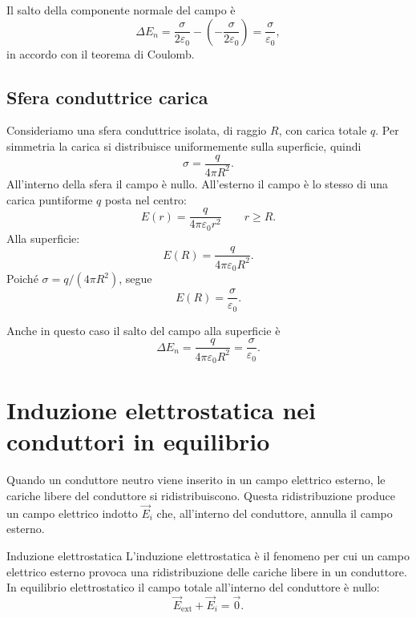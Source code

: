 \documentclass[a4paper]{article}
\begin{document}
Il salto della componente normale del campo è
\[
    \Delta E_n=\frac{\sigma}{2\varepsilon_0}-\left(-\frac{\sigma}{2\varepsilon_0}\right)=\frac{\sigma}{\varepsilon_0},
\]
in accordo con il teorema di Coulomb.

\subsection{Sfera conduttrice carica}

Consideriamo una sfera conduttrice isolata, di raggio \(R\), con carica totale \(q\). Per simmetria la carica si distribuisce uniformemente sulla superficie, quindi
\[
    \sigma=\frac{q}{4\pi R^2}.
\]
All'interno della sfera il campo è nullo. All'esterno il campo è lo stesso di una carica puntiforme \(q\) posta nel centro:
\[
    E(r)=\frac{q}{4\pi\varepsilon_0r^2}\qquad r\geq R.
\]
Alla superficie:
\[
    E(R)=\frac{q}{4\pi\varepsilon_0R^2}.
\]
Poiché \(\sigma=q/(4\pi R^2)\), segue
\[
    E(R)=\frac{\sigma}{\varepsilon_0}.
\]

\begin{center}
\end{center}

Anche in questo caso il salto del campo alla superficie è
\[
    \Delta E_n=\frac{q}{4\pi\varepsilon_0R^2}=\frac{\sigma}{\varepsilon_0}.
\]

\section{Induzione elettrostatica nei conduttori in equilibrio}

Quando un conduttore neutro viene inserito in un campo elettrico esterno, le cariche libere del conduttore si ridistribuiscono. Questa ridistribuzione produce un campo elettrico indotto \(\vec{E}_i\) che, all'interno del conduttore, annulla il campo esterno.

\begin{snippetdefinition}{Induzione elettrostatica}
    L'induzione elettrostatica è il fenomeno per cui un campo elettrico esterno provoca una ridistribuzione delle cariche libere in un conduttore. In equilibrio elettrostatico il campo totale all'interno del conduttore è nullo:
    \[
        \vec{E}_{\mathrm{ext}}+\vec{E}_i=\vec{0}.
    \]
\end{snippetdefinition}
\end{document}
